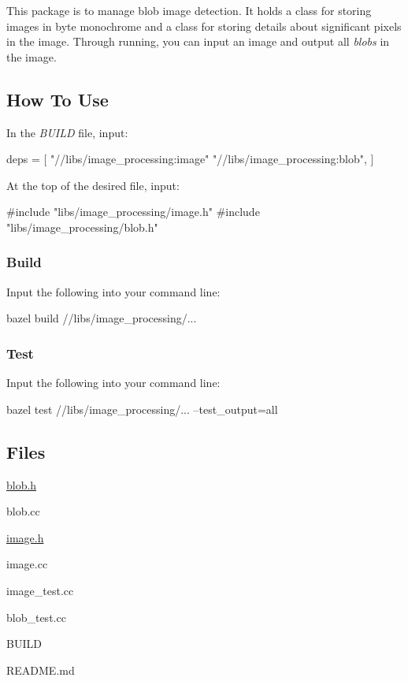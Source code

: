This package is to manage blob image detection. It holds a class for storing images in byte monochrome and a class for storing details about significant pixels in the image. Through running, you can input an image and output all {\itshape blobs} in the image.

\subsection*{How To Use}

In the {\itshape B\+U\+I\+LD} file, input\+: 
\begin{DoxyCode}
deps = [
    "//libs/image\_processing:image"
    "//libs/image\_processing:blob",
    ]
\end{DoxyCode}
 At the top of the desired file, input\+: 
\begin{DoxyCode}
#include "libs/image\_processing/image.h"
#include "libs/image\_processing/blob.h"
\end{DoxyCode}


\subsubsection*{Build}

Input the following into your command line\+: 
\begin{DoxyCode}
bazel build //libs/image\_processing/...
\end{DoxyCode}


\subsubsection*{Test}

Input the following into your command line\+: 
\begin{DoxyCode}
bazel test //libs/image\_processing/... --test\_output=all
\end{DoxyCode}


\subsection*{Files}


\begin{DoxyItemize}
\item \hyperlink{blob_8h_source}{blob.\+h}
\item blob.\+cc
\item \hyperlink{image_8h}{image.\+h}
\item image.\+cc ~\newline
~\newline

\item image\+\_\+test.\+cc
\item blob\+\_\+test.\+cc ~\newline
~\newline

\item B\+U\+I\+LD
\item R\+E\+A\+D\+M\+E.\+md
\end{DoxyItemize}

